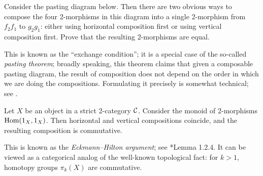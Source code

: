 \begin{exercise}\label{ec:exchange_condition}
  Consider the pasting diagram below. Then there are two obvious ways to
  compose the four 2-morphisms in this diagram into a single 2-morphism from
  $f_2f_1$ to $g_2g_1$: either using horizontal composition first or using
  vertical composition first. Prove that the resulting 2-morphisms are equal.

  \begin{figure}[h]
  \end{figure}
  This is known as the ``exchange condition''; it is a special case of the
  so-called \emph{pasting theorem}; broadly speaking, this theorem claims that given a
  composable pasting diagram, the result of composition does not depend on the order
  in which we are doing the compositions. Formulating it precisely is somewhat
  technical; see .
\end{exercise}
\begin{lemma}\label{l:eckmann-hilton}
  Let $X$ be an object in a strict 2-category $\mathcal{C}$. Consider the monoid of
  2-morphisms $\operatorname{Hom}(1_X, 1_X)$. Then horizontal and vertical compositions
  coincide, and the resulting composition is commutative.
\end{lemma}
This is known as the \emph{Eckmann--Hilton argument}; see
*{Lemma 1.2.4}. It can be viewed as a categorical analog of
the well-known topological fact: for $k>1$, homotopy groups $\pi_k(X)$
are commutative.

